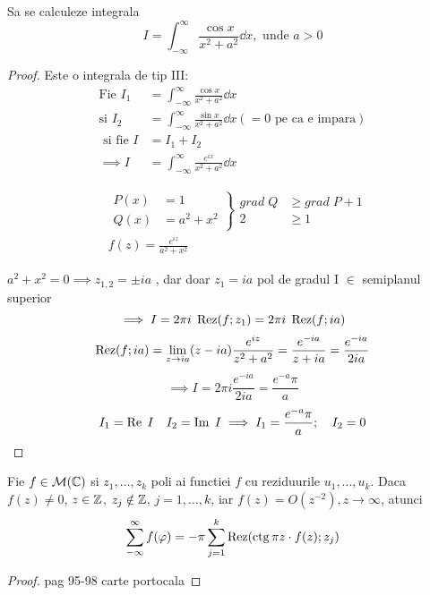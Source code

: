 \begin{aplicatie}
    Sa se calculeze integrala
    \[
        I = \int_{-\infty}^{\infty} \frac{\cos x}{x^2+a^2} \dd x, \text{ unde } a>0
    \]
    \begin{proof}
        Este o integrala de tip $\mathrm{III}$:
        \begin{align*}
            \text{Fie } I_1 &= \int_{-\infty}^{\infty} \frac{\cos x}{x^2+a^2} \dd x \\
            \text{si }  I_2 &= \int_{-\infty}^{\infty} \frac{\sin x}{x^2+a^2} \dd x (= 0 \text{ pe ca e impara}) \\
            \text{ si fie } I &= I_1+I_2 \\
            \implies I &= \int_{-\infty}^{\infty} \frac{e^{ix}}{x^2+a^2} \dd x
        \end{align*}

        \begin{align*}
            &\left .
                \begin{aligned}
                    P(x) &= 1 \\
                    Q(x) &= a^2 +x^2
                \end{aligned}
            \right \}
            \begin{aligned}
                grad\; Q &\geq grad\; P+1 \\
                2 &\geq 1
            \end{aligned}
            \\
            &f(z) = \frac{e^{iz}}{a^2 +x^2}
        \end{align*}

        $a^2 +x^2 = 0 \implies z_{1,2} = \pm i a$ , dar doar $z_1 = i a$
        pol de gradul I $\in$ semiplanul superior
        \[
            \implies I = 2 \pi i\; \operatorname{Rez}(f;z_1) = 2 \pi i\; \operatorname{Rez}(f;i a)
        \]
        \[
            \operatorname{Rez}(f;i a) = \lim_{z \to ia} (z - i a) \frac{e^{iz}}{z^2+a^2}
                = \frac{e^{-ia}}{z + i a} = \frac{e^{-ia}}{2ia}
        \]
        \[
            \implies I = 2 \pi i \frac{e^{-ia}}{2ia} = \frac{e^{-a}\pi}{a}
        \]
        \[
            I_1 = \operatorname{Re} \; I \quad I_2=\operatorname{Im} \; I
                \implies I_1 = \frac{e^{-a}\pi}{a}; \quad I_2 = 0
        \]
    \end{proof}
\end{aplicatie}

\begin{theorem}
    Fie $f \in \mathcal{M}(\mathbb{C})$ si $z_1 , \dotsc , z_k$ poli ai functiei $f$ cu
    reziduurile $u_1, \dotsc , u_k$.
    Daca $f(z) \neq 0$, $z \in \mathbb{Z}$, $z_j \notin \mathbb{Z}$, $j=1, \dotsc, k$,
    iar $f(z) = O(z^{-2}), z\to \infty$, atunci
    \[
        \sum_{-\infty}^{\infty} f(\varphi) = -\pi \sum_{j=1}^{k} \operatorname{Rez} ( \operatorname{ctg} \pi z \cdot f(z);z_j )
    \]
    \begin{proof}
        pag 95-98 carte portocala
    \end{proof}
\end{theorem}

